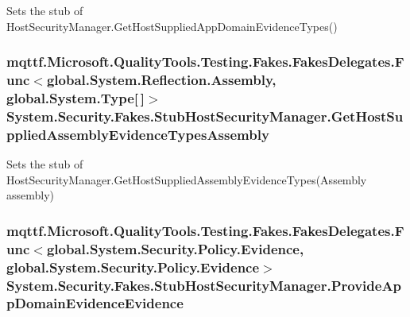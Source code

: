 Sets the stub of Host\-Security\-Manager.\-Get\-Host\-Supplied\-App\-Domain\-Evidence\-Types()

\hypertarget{class_system_1_1_security_1_1_fakes_1_1_stub_host_security_manager_ad73a3e7cc9e430119b42b1c239849c07}{
\subsubsection[{Get\-Host\-Supplied\-Assembly\-Evidence\-Types\-Assembly}]{\setlength{\rightskip}{0pt plus 5cm}mqttf.\-Microsoft.\-Quality\-Tools.\-Testing.\-Fakes.\-Fakes\-Delegates.\-Func$<$global.\-System.\-Reflection.\-Assembly, global.\-System.\-Type\mbox{[}$\,$\mbox{]}$>$ System.\-Security.\-Fakes.\-Stub\-Host\-Security\-Manager.\-Get\-Host\-Supplied\-Assembly\-Evidence\-Types\-Assembly}}\label{class_system_1_1_security_1_1_fakes_1_1_stub_host_security_manager_ad73a3e7cc9e430119b42b1c239849c07}


Sets the stub of Host\-Security\-Manager.\-Get\-Host\-Supplied\-Assembly\-Evidence\-Types(\-Assembly assembly)

\hypertarget{class_system_1_1_security_1_1_fakes_1_1_stub_host_security_manager_a11ef74d226b399cdf912f34c920184b9}{
\subsubsection[{Provide\-App\-Domain\-Evidence\-Evidence}]{\setlength{\rightskip}{0pt plus 5cm}mqttf.\-Microsoft.\-Quality\-Tools.\-Testing.\-Fakes.\-Fakes\-Delegates.\-Func$<$global.\-System.\-Security.\-Policy.\-Evidence, global.\-System.\-Security.\-Policy.\-Evidence$>$ System.\-Security.\-Fakes.\-Stub\-Host\-Security\-Manager.\-Provide\-App\-Domain\-Evidence\-Evidence}}\label{class_system_1_1_security_1_1_fakes_1_1_stub_host_security_manager_a11ef74d226b399cdf912f34c920184b9}


